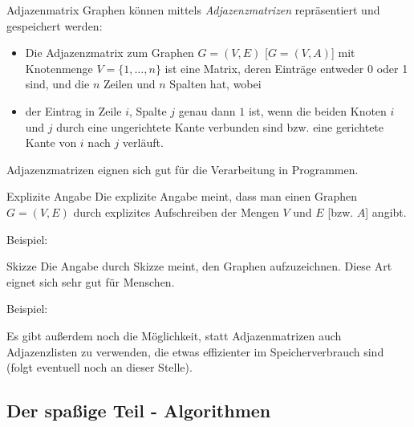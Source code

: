 \documentclass{panikzettel}
\begin{document}
{	\begin{defi}{Adjazenmatrix}
		Graphen können mittels \emph{Adjazenzmatrizen} repräsentiert und gespeichert werden:
		
		\begin{itemize}
			\item Die Adjazenzmatrix zum Graphen $G = (V,E)$ [$G=(V,A)$] mit Knotenmenge $V= \{1,\dots, n\}$ ist eine Matrix, deren Einträge entweder 0 oder 1 sind, und die $n$ Zeilen und $n$ Spalten hat, wobei
			
			\item der Eintrag in Zeile $i$, Spalte $j$ genau dann $1$ ist, wenn die beiden Knoten $i$ und $j$ durch eine ungerichtete Kante verbunden sind bzw. eine gerichtete Kante von $i$ nach $j$ verläuft.
		\end{itemize}
	
	Adjazenzmatrizen eignen sich gut für die Verarbeitung in Programmen.
	\end{defi}

\begin{halfboxl}
	\vspace{-\baselineskip}		
	\begin{defi}{Explizite Angabe}
		Die explizite Angabe meint, dass man einen Graphen $G= (V,E)$ durch explizites Aufschreiben der Mengen $V$ und $E$ [bzw. $A$] angibt.
		
		Beispiel: 
	\end{defi}
	
\end{halfboxl}%
\begin{halfboxr}
	\vspace{-\baselineskip}	
	\begin{defi}{Skizze}
		Die Angabe durch Skizze meint, den Graphen aufzuzeichnen. Diese Art eignet sich sehr gut für Menschen.
		
		Beispiel: 
	\end{defi}
	
\end{halfboxr}

Es gibt außerdem noch die Möglichkeit, statt Adjazenmatrizen auch Adjazenzlisten zu verwenden, die etwas effizienter im Speicherverbrauch sind (folgt eventuell noch an dieser Stelle).

\subsection{Der spaßige Teil - Algorithmen}

}
\end{document}
